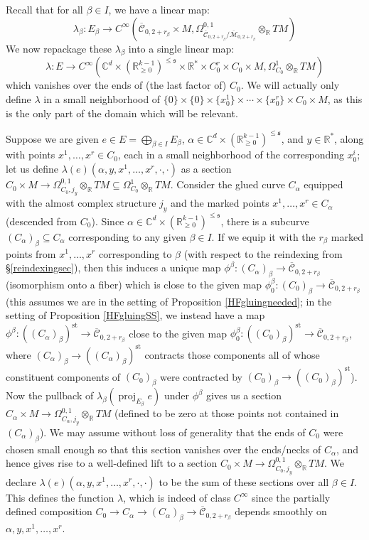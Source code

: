 \documentclass[12pt]{article}
\theoremstyle{definition}
\theoremstyle{remark}
\numberwithin{equation}{subsection}
\newcommand{\s}{\mathfrak s}
\newcommand{\CC}{\mathbb C}
\newcommand{\RR}{\mathbb R}
\newcommand{\proj}{\operatorname{proj}}
\newcommand{\Mbar}{\overline{\mathcal M}}
\newcommand{\Cbar}{\overline{\mathcal C}}
\newcommand{\st}{\mathrm{st}}
\begin{document}
Recall that for all $\beta\in I$, we have a linear map:
\begin{equation}
\lambda_\beta:E_\beta\to C^\infty(\Cbar_{0,2+r_\beta}\times M,\Omega^{0,1}_{\Cbar_{0,2+r_\beta}/\Mbar_{0,2+r_\beta}}\otimes_\RR TM)
\end{equation}
We now repackage these $\lambda_\beta$ into a single linear map:
\begin{equation}
\lambda:E\to C^\infty(\CC^d\times(\RR_{\geq 0}^{k-1})^{\leq\s}\times\RR^\ast\times C_0^r\times C_0\times M,\Omega^1_{C_0}\otimes_\RR TM)
\end{equation}
which vanishes over the ends of (the last factor of) $C_0$.  We will actually only define $\lambda$ in a small neighborhood of $\{0\}\times\{0\}\times\{x_0^1\}\times\cdots\times\{x_0^r\}\times C_0\times M$, as this is the only part of the domain which will be relevant.

Suppose we are given $e\in E=\bigoplus_{\beta\in I}E_\beta$, $\alpha\in\CC^d\times(\RR_{\geq 0}^{k-1})^{\leq\s}$, and $y\in\RR^\ast$, along with points $x^1,\ldots,x^r\in C_0$, each in a small neighborhood of the corresponding $x_0^i$; let us define $\lambda(e)(\alpha,y,x^1,\ldots,x^r,\cdot,\cdot)$ as a section $C_0\times M\to\Omega^{0,1}_{C_0,j_y}\otimes_\RR TM\subseteq\Omega^1_{C_0}\otimes_\RR TM$.  Consider the glued curve $C_\alpha$ equipped with the almost complex structure $j_y$ and the marked points $x^1,\ldots,x^r\in C_\alpha$ (descended from $C_0$).  Since $\alpha\in\CC^d\times(\RR_{\geq 0}^{k-1})^{\leq\s}$, there is a subcurve $(C_\alpha)_\beta\subseteq C_\alpha$ corresponding to any given $\beta\in I$.  If we equip it with the $r_\beta$ marked points from $x^1,\ldots,x^r$ corresponding to $\beta$ (with respect to the reindexing from \S\ref{reindexingsec}), then this induces a unique map $\phi^\beta:(C_\alpha)_\beta\to\Cbar_{0,2+r_\beta}$ (isomorphism onto a fiber) which is close to the given map $\phi_0^\beta:(C_0)_\beta\to\Cbar_{0,2+r_\beta}$ (this assumes we are in the setting of Proposition \ref{HFgluingneeded}; in the setting of Proposition \ref{HFgluingSS}, we instead have a map $\phi^\beta:((C_\alpha)_\beta)^\st\to\Cbar_{0,2+r_\beta}$ close to the given map $\phi_0^\beta:((C_0)_\beta)^\st\to\Cbar_{0,2+r_\beta}$, where $(C_\alpha)_\beta\to((C_\alpha)_\beta)^\st$ contracts those components all of whose constituent components of $(C_0)_\beta$ were contracted by $(C_0)_\beta\to((C_0)_\beta)^\st$).  Now the pullback of $\lambda_\beta(\proj_{E_\beta}e)$ under $\phi^\beta$ gives us a section $C_\alpha\times M\to\Omega^{0,1}_{C_\alpha,j_y}\otimes_\RR TM$ (defined to be zero at those points not contained in $(C_\alpha)_\beta$).  We may assume without loss of generality that the ends of $C_0$ were chosen small enough so that this section vanishes over the ends/necks of $C_\alpha$, and hence gives rise to a well-defined lift to a section $C_0\times M\to\Omega^{0,1}_{C_0,j_y}\otimes_\RR TM$.  We declare $\lambda(e)(\alpha,y,x^1,\ldots,x^r,\cdot,\cdot)$ to be the sum of these sections over all $\beta\in I$.  This defines the function $\lambda$, which is indeed of class $C^\infty$ since the partially defined composition $C_0\to C_\alpha\to(C_\alpha)_\beta\to\Cbar_{0,2+r_\beta}$ depends smoothly on $\alpha,y,x^1,\ldots,x^r$.
\end{document}
